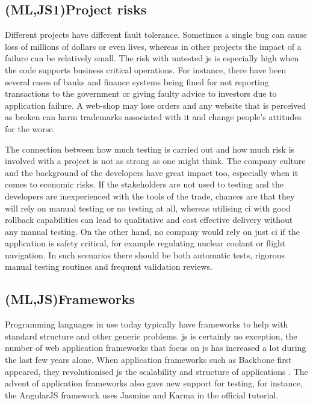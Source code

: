 \documentclass[11pt]{article}
\begin{document}
\subsection{(ML,JS1)Project risks}
\label{subsec:projectrisks}

Different projects have different fault tolerance. Sometimes a single bug can cause loss of millions of dollars or even lives, whereas in other projects the impact of a failure can be relatively small. The risk with untested \gls{js} is especially high when the code supports business critical operations. For instance, there have been several cases of banks and finance systems being fined for not reporting transactions to the government \cite{Bug1} or giving faulty advice to investors \cite{Bug2} due to application failure. A web-shop may lose orders and any website that is perceived as broken can harm trademarks associated with it and change people's attitudes for the worse.

The connection between how much testing is carried out and how much risk is involved with a project is not as strong as one might think. The company culture and the background of the developers have great impact too, especially when it comes to economic risks. If the stakeholders are not used to testing and the developers are inexperienced with the tools of the trade, chances are that they will rely on manual testing or no testing at all, whereas utilising \gls{ci} with good rollback capabilities can lead to qualitative and cost effective delivery without any manual testing. On the other hand, no company would rely on just \gls{ci} if the application is safety critical, for example regulating nuclear coolant or flight navigation. In such scenarios there should be both automatic tests, rigorous manual testing routines and frequent validation reviews. \cite[questions~14,~38]{Ahnve}

\subsection{(ML,JS)Frameworks}
\label{subsec:frameworks}

Programming languages in use today typically have frameworks to help with standard structure and other generic problems. \gls{js} is certainly no exception, the number of web application frameworks that focus on \gls{js} has increased a lot during the last few years alone. When application frameworks such as Backbone first appeared, they revolutionised \gls{js} the scalability and structure of applications \cite[question~23]{Ahnve}\cite[question~11]{Rovegard}. The advent of application frameworks also gave new support for testing, for instance, the AngularJS framework uses Jasmine and Karma in the official tutorial.
\end{document}

